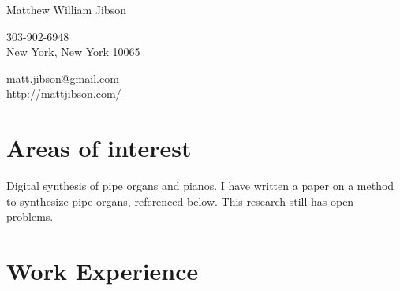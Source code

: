 \documentclass[10pt, a4paper]{article}
\begin{document}
\sloppy

\reversemarginpar
{{\huge Matthew William Jibson}\\[1.0cm]
\parbox{.5\linewidth}{
\vspace{\baselineskip}
303-902-6948\\
New York, New York 10065
}
\parbox{.5\linewidth}{
\begin{flushright}
\href{mailto:matt.jibson@gmail.com}{matt.jibson@gmail.com}\\
\href{http://mattjibson.com/}{http://mattjibson.com/}\\
\end{flushright}
}

\section*{Areas of interest}
Digital synthesis of pipe organs and pianos. I have written a paper on a method to synthesize pipe organs, referenced below. This research still has open problems.

\section*{Work Experience}

}
\end{document}
